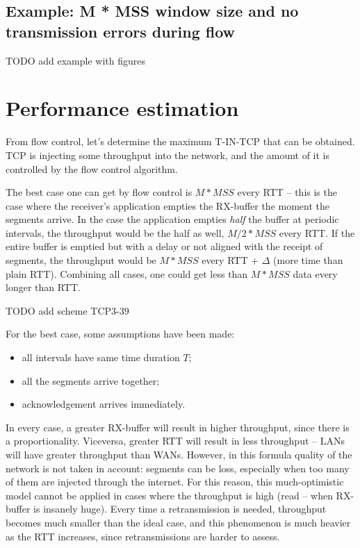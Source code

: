 \documentclass[a4paper, 11pt]{report}
\begin{document}
\subsection{Example: M * MSS window size and no transmission errors during flow}

TODO add example with figures

\section{Performance estimation}

From flow control, let's determine the maximum T-IN-TCP that can be obtained.
TCP is injecting some throughput into the network, and the amount of it is
controlled by the flow control algorithm. 

The best case one can get by flow control is $M * MSS$ every RTT \--- this is
the case where the receiver's application empties the RX-buffer the moment the
segments arrive. In the case the application empties \emph{half} the buffer at
periodic intervals, the throughput would be the half as well, $M/2 * MSS$ every
RTT. If the entire buffer is emptied but with a delay or not aligned with the
receipt of segments, the throughput would be $M * MSS$ every RTT + $\Delta$
(more time than plain RTT). Combining all cases, one could get less than $M *
MSS$ data every longer than RTT.

TODO add scheme TCP3-39

For the best case, some assumptions have been made:
\begin{itemize}
	\item all intervals have same time duration $T$;
    \item all the segments arrive together;
    \item acknowledgement arrives immediately.
\end{itemize}

In every case, a greater RX-buffer will result in higher throughput, since
there is a proportionality. Viceversa, greater RTT will result in less
throughput \--- LANs will have greater throughput than WANs. However, in this
formula quality of the network is not taken in account: segments can be loss,
especially when too many of them are injected through the internet. For this
reason, this much-optimistic model cannot be applied in cases where the
throughput is high (read \--- when RX-buffer is insanely huge). Every time a
retransmission is needed, throughput becomes much smaller than the ideal case,
and this phenomenon is much heavier as the RTT increases, since retransmissions
are harder to assess.
\end{document}
